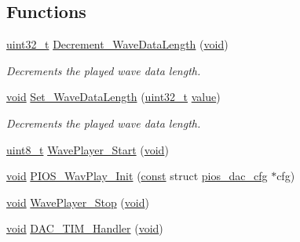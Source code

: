 \subsection*{Functions}
\begin{DoxyCompactItemize}
\item 
\hyperlink{stdint_8h_a435d1572bf3f880d55459d9805097f62}{uint32\-\_\-t} \hyperlink{group___w_a_v_e_p_l_a_y_e_r___private___variables_ga320f95ce300a40d4d6ac9330571b69f5}{Decrement\-\_\-\-Wave\-Data\-Length} (\hyperlink{group___n_a_m_e_ga18028b8badbf1ea7e704ccac3c488e82}{void})
\begin{DoxyCompactList}\small\item\em Decrements the played wave data length. \end{DoxyCompactList}\item 
\hyperlink{group___n_a_m_e_ga18028b8badbf1ea7e704ccac3c488e82}{void} \hyperlink{group___w_a_v_e_p_l_a_y_e_r___private___variables_ga06d4df1b9aa3d4d9b1917165d566fa6e}{Set\-\_\-\-Wave\-Data\-Length} (\hyperlink{stdint_8h_a435d1572bf3f880d55459d9805097f62}{uint32\-\_\-t} \hyperlink{protocol_8h_a4e9aec275e566b978a3ccb4e043d8c61}{value})
\begin{DoxyCompactList}\small\item\em Decrements the played wave data length. \end{DoxyCompactList}\item 
\hyperlink{stdint_8h_aba7bc1797add20fe3efdf37ced1182c5}{uint8\-\_\-t} \hyperlink{group___w_a_v_e_p_l_a_y_e_r___private___variables_gad653a67ad3415d1d9d9c91e13904fb06}{Wave\-Player\-\_\-\-Start} (\hyperlink{group___n_a_m_e_ga18028b8badbf1ea7e704ccac3c488e82}{void})
\item 
\hyperlink{group___n_a_m_e_ga18028b8badbf1ea7e704ccac3c488e82}{void} \hyperlink{group___w_a_v_e_p_l_a_y_e_r___private___variables_ga833570d033bad7d2098b024caec552be}{P\-I\-O\-S\-\_\-\-Wav\-Play\-\_\-\-Init} (\hyperlink{group___n_a_m_e_ga7ae6d0e43244213b34de2c2b9aa30da6}{const} struct \hyperlink{structpios__dac__cfg}{pios\-\_\-dac\-\_\-cfg} $\ast$cfg)
\item 
\hyperlink{group___n_a_m_e_ga18028b8badbf1ea7e704ccac3c488e82}{void} \hyperlink{group___w_a_v_e_p_l_a_y_e_r___private___variables_ga29135d928d42113c2b530dbb74b16ecb}{Wave\-Player\-\_\-\-Stop} (\hyperlink{group___n_a_m_e_ga18028b8badbf1ea7e704ccac3c488e82}{void})
\item 
\hyperlink{group___n_a_m_e_ga18028b8badbf1ea7e704ccac3c488e82}{void} \hyperlink{group___w_a_v_e_p_l_a_y_e_r___private___variables_gaea75313b54903975f2fdc7544db2be56}{D\-A\-C\-\_\-\-T\-I\-M\-\_\-\-Handler} (\hyperlink{group___n_a_m_e_ga18028b8badbf1ea7e704ccac3c488e82}{void})

\end{DoxyCompactItemize}
